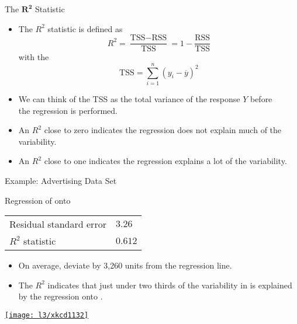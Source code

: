 \documentclass[mathserif, aspectratio=169]{beamer}
\begin{document}
\begin{frame}{The $\bm{R^2}$ Statistic}
	\begin{itemize}
		\item The $R^2$ statistic is defined as
			\[ R^2 = \frac{\text{TSS} - \text{RSS}}{\text{TSS}} = 1 - \frac{\text{RSS}}{\text{TSS}} \]
			with the   
			\[ \text{TSS} = \sum_{i=1}^{n} (y_i - \overline{y})^2 \]
		\item We can think of the TSS as the total variance of the response $Y$ before\\
			the regression is performed.
		\item An $R^2$ close to zero indicates the regression does not explain much of the variability.
		\item An $R^2$ close to one indicates the regression explains a lot of the variability.
	\end{itemize}
\end{frame}

\begin{frame}{Example: Advertising Data Set}
	\begin{popblock}{0.5\textwidth}{Regression of  onto }
		\begin{tabular}[h]{ll}
			Residual standard error & $3.26$ \\
			$R^2$ statistic & $0.612$ \\
		\end{tabular}
	\end{popblock}
	\begin{itemize}
		\item On average,  deviate by 3,260 units from the regression line.
		\item The $R^2$ indicates that just under two thirds of the variability in  is explained\\
			by the regression onto .
	\end{itemize}
\end{frame}

\begin{frame}[plain]
	\begin{center}
		\href{https://xkcd.com/1132/}{\texttt{[image: l3/xkcd1132]}}
	\end{center}
\end{frame}
\end{document}
